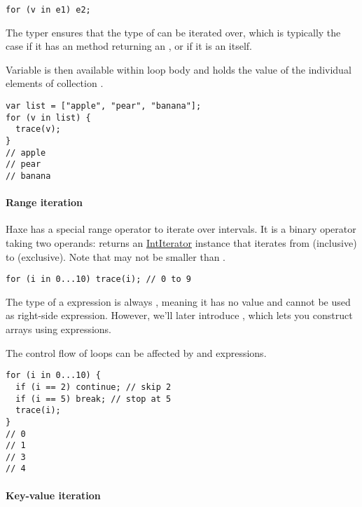 \begin{lstlisting}
for (v in e1) e2;
\end{lstlisting}

The typer ensures that the type of  can be iterated over, which is typically the case if it has an   method returning an , or if it is an  itself.

Variable  is then available within loop body  and holds the value of the individual elements of collection .

\begin{lstlisting}
var list = ["apple", "pear", "banana"];
for (v in list) {
  trace(v);
}
// apple
// pear
// banana
\end{lstlisting}

\paragraph{Range iteration}

Haxe has a special range operator to iterate over intervals. It is a binary operator taking two  operands:  returns an \href{http://api.haxe.org/IntIterator.html}{IntIterator} instance that iterates from  (inclusive) to  (exclusive). Note that  may not be smaller than .

\begin{lstlisting}
for (i in 0...10) trace(i); // 0 to 9
\end{lstlisting}

The type of a  expression is always , meaning it has no value and cannot be used as right-side expression. However, we'll later introduce , which lets you construct arrays using  expressions.

The control flow of loops can be affected by  and  expressions.

\begin{lstlisting}
for (i in 0...10) {
  if (i == 2) continue; // skip 2
  if (i == 5) break; // stop at 5
  trace(i);
}
// 0
// 1
// 3
// 4
\end{lstlisting}


\paragraph{Key-value iteration}
\label{expression-for-keyvalue}

